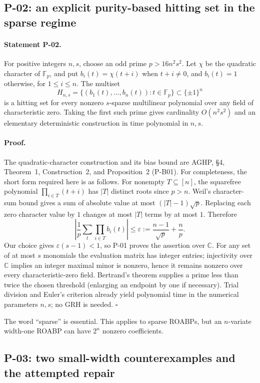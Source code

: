 \documentclass[11pt,a4paper]{article}
\theoremstyle{definition}\newtheorem{definition}{Definition}
\begin{document}
\subsection{P-02: an explicit purity-based hitting set in the sparse regime}
\paragraph{Statement P-02.}
For positive integers $n,s$, choose an odd prime $p>16n^2s^2$. Let $\chi$ be the quadratic character of $\mathbb F_p$, and put $b_i(t)=\chi(t+i)$ when $t+i\ne0$, and $b_i(t)=1$ otherwise, for $1\le i\le n$. The multiset
\[
 H_{n,s}=\{(b_1(t),\ldots,b_n(t)):t\in\mathbb F_p\}\subset\{\pm1\}^n
\]
is a hitting set for every nonzero $s$-sparse multilinear polynomial over any field of characteristic zero. Taking the first such prime gives cardinality $O(n^2s^2)$ and an elementary deterministic construction in time polynomial in $n,s$.
\paragraph{Proof.}
The quadratic-character construction and its bias bound are AGHP, \S4, Theorem~1, Construction~2, and Proposition~2 (P-B01). For completeness, the short form required here is as follows. For nonempty $T\subseteq[n]$, the squarefree polynomial $\prod_{i\in T}(t+i)$ has $|T|$ distinct roots since $p>n$. Weil's character-sum bound gives a sum of absolute value at most $(|T|-1)\sqrt p$. Replacing each zero character value by $1$ changes at most $|T|$ terms by at most $1$. Therefore
\[
 \left|\frac1p\sum_t\prod_{i\in T}b_i(t)\right|
 \le \varepsilon:=\frac{n-1}{\sqrt p}+\frac np.
\]
Our choice gives $\varepsilon(s-1)<1$, so P-01 proves the assertion over $\mathbb C$. For any set of at most $s$ monomials the evaluation matrix has integer entries; injectivity over $\mathbb C$ implies an integer maximal minor is nonzero, hence it remains nonzero over every characteristic-zero field. Bertrand's theorem supplies a prime less than twice the chosen threshold (enlarging an endpoint by one if necessary). Trial division and Euler's criterion already yield polynomial time in the numerical parameters $n,s$; no GRH is needed. $\square$

The word ``sparse'' is essential. This applies to sparse ROABPs, but an $n$-variate width-one ROABP can have $2^n$ nonzero coefficients.

\subsection{P-03: two small-width counterexamples and the attempted repair}
\end{document}
